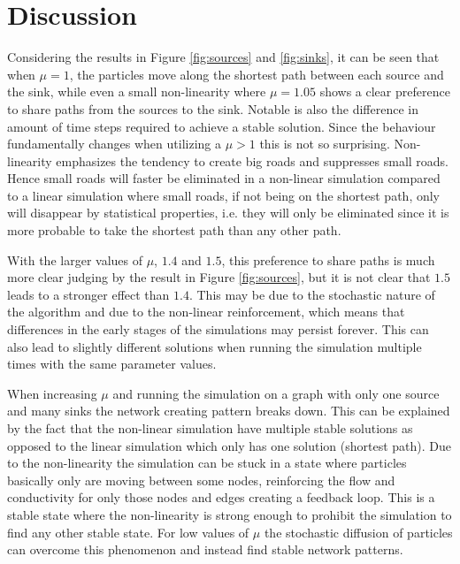 \section{Discussion}
\label{sec:discussion}
Considering the results in Figure \ref{fig:sources} and \ref{fig:sinks}, it can be seen that when $\mu = 1$, the particles move along the shortest path between each source and the sink, while even a small non-linearity where $\mu = 1.05$ shows a clear preference to share paths from the sources to the sink. Notable is also the difference in amount of time steps required to achieve a stable solution. Since the behaviour fundamentally changes when utilizing a $\mu > 1$ this is not so surprising. Non-linearity emphasizes the tendency to create big roads and suppresses small roads. Hence small roads will faster be eliminated in a non-linear simulation compared to a linear simulation where small roads, if not being on the shortest path, only will disappear by statistical properties, i.e. they will only be eliminated since it is more probable to take the shortest path than any other path. 

With the larger values of $\mu$, $1.4$ and $1.5$, this preference to share paths is much more clear judging by the result in Figure \ref{fig:sources}, but it is not clear that $1.5$ leads to a stronger effect than $1.4$. This may be due to the stochastic nature of the algorithm and due to the non-linear reinforcement, which means that differences in the early stages of the simulations may persist forever. This can also lead to slightly different solutions when running the simulation multiple times with the same parameter values.

When increasing $\mu$ and running the simulation on a graph with only one source and many sinks the network creating pattern breaks down. This can be explained by the fact that the non-linear simulation have multiple stable solutions as opposed to the linear simulation which only has one solution (shortest path). Due to the non-linearity the simulation can be stuck in a state where particles basically only are moving between some nodes, reinforcing the flow and conductivity for only those nodes and edges creating a feedback loop. This is a stable state where the non-linearity is strong enough to prohibit the simulation to find any other stable state. For low values of $\mu$ the stochastic diffusion of particles can overcome this phenomenon and instead find stable network patterns. 

